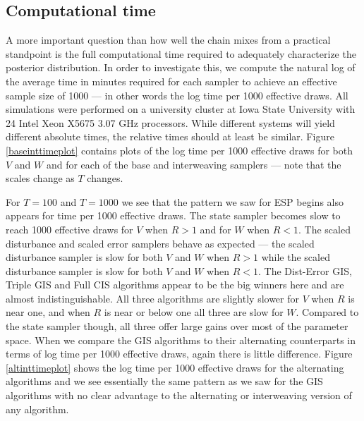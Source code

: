 \documentclass{article}
\begin{document}
\subsection{Computational time}\label{sec:LLMtime}

A more important question than how well the chain mixes from a practical standpoint is the full computational time required to adequately characterize the posterior distribution. In order to investigate this, we compute the natural log of the average time in minutes required for each sampler to achieve an effective sample size of 1000 --- in other words the log time per 1000 effective draws. All simulations were performed on a university cluster at Iowa State University with 24 Intel Xeon X5675 3.07 GHz processors. While different systems will yield different absolute times, the relative times should at least be similar. Figure \ref{baseinttimeplot} contains plots of the log time per 1000 effective draws for both $V$ and $W$ and for each of the base and interweaving samplers --- note that the scales change as $T$ changes. 

For $T=100$ and $T=1000$ we see that the pattern we saw for ESP begins also appears for time per 1000 effective draws. The state sampler becomes slow to reach 1000 effective draws for $V$ when $R>1$ and for $W$ when $R<1$. The scaled disturbance and scaled error samplers behave as expected --- the scaled disturbance sampler is slow for both $V$ and $W$ when $R>1$ while the scaled disturbance sampler is slow for both $V$ and $W$ when $R<1$. The Dist-Error GIS, Triple GIS and Full CIS algorithms appear to be the big winners here and are almost indistinguishable. All three algorithms are slightly slower for $V$ when $R$ is near one, and when $R$ is near or below one all three are slow for $W$. Compared to the state sampler though, all three offer large gains over most of the parameter space. When we compare the GIS algorithms to their alternating counterparts in terms of log time per 1000 effective draws, again there is little difference. Figure \ref{altinttimeplot} shows the log time per 1000 effective draws for the alternating algorithms and we see essentially the same pattern as we saw for the GIS algorithms with no clear advantage to the alternating or interweaving version of any algorithm.
\end{document}
